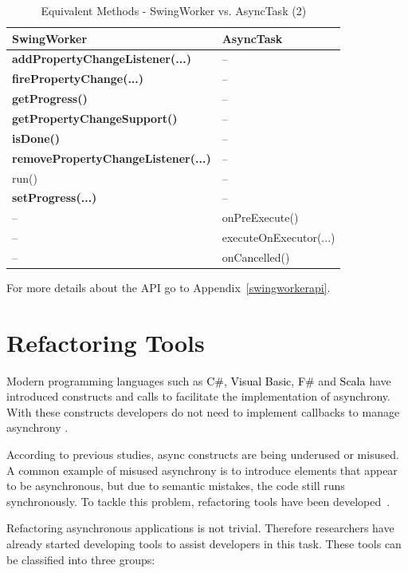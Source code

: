 \documentclass[type=bsc,accentcolor=tud9c]{tudthesis}
\newcommand{\framework}[1]{\textcolor{black}{#1}}
\begin{document}
\begin{table}[h]
{\small
\begin{center}
\begin{tabular}{|C{6cm} | C{6cm}|}
\hline
\bf SwingWorker~\cite{swingworkerapi} & \bf AsyncTask~\cite{ulrAndroidAsyncTask}\\\hline
\bf addPropertyChangeListener(...) & --\\
\bf firePropertyChange(...) & --\\
\bf getProgress() & --\\
\bf getPropertyChangeSupport() & --\\
\bf isDone() & --\\
\bf removePropertyChangeListener(...)& --\\
run()& --\\
\bf setProgress(...)& --\\\hline
-- & onPreExecute() \\
-- & executeOnExecutor(...)\\
-- & onCancelled()\\\hline
\end{tabular}
\end{center}
\caption{Equivalent Methods - SwingWorker vs. AsyncTask (2)}
\label{table:worker-task-non-equivalent}
}
\end{table}

For more details about the  API go to Appendix~\ref{swingworkerapi}. 

\section{Refactoring Tools}
\label{sec:refactoring-tools}
Modern programming languages such as \framework{C\#}, \framework{Visual Basic}, \framework{F\#} and \framework{Scala} have introduced  constructs and  calls to facilitate the implementation of asynchrony. With these constructs developers do not need to implement callbacks to manage asynchrony \cite{paperAsyncMobile}. 

According to previous studies, async constructs are being underused or misused. A common example of misused asynchrony is to introduce elements that appear to be asynchronous, but due to semantic mistakes, the code still runs synchronously. To tackle this problem, refactoring tools have been developed~\cite{paperAsyncMobile}. 

Refactoring asynchronous applications is not trivial. Therefore researchers have already started developing tools to assist developers in this task. These tools can be classified into three groups:
\end{document}
